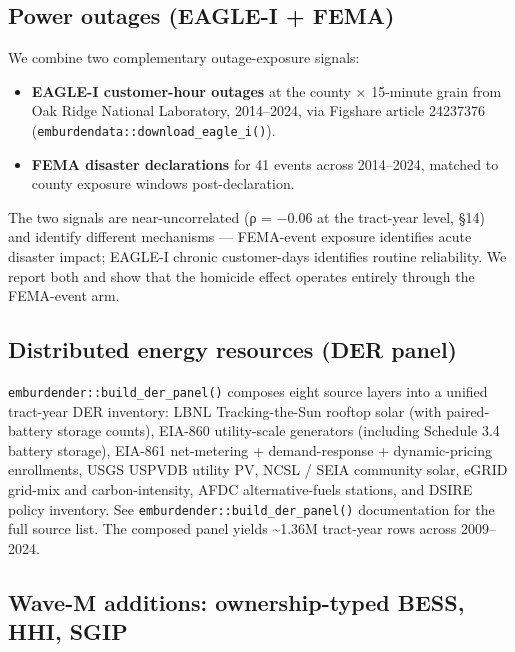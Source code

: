 \documentclass[
]{article}
\providecommand{\tightlist}{%
  \setlength{\itemsep}{0pt}\setlength{\parskip}{0pt}}
\begin{document}
\hypertarget{power-outages-eagle-i-fema}{%
\subsection{Power outages (EAGLE-I +
FEMA)}\label{power-outages-eagle-i-fema}}

We combine two complementary outage-exposure signals:

\begin{itemize}
\tightlist
\item
  \textbf{EAGLE-I customer-hour outages} at the county × 15-minute grain
  from Oak Ridge National Laboratory, 2014--2024, via Figshare article
  24237376 (\texttt{emburdendata::download\_eagle\_i()}).
\item
  \textbf{FEMA disaster declarations} for 41 events across 2014--2024,
  matched to county exposure windows post-declaration.
\end{itemize}

The two signals are near-uncorrelated (ρ = −0.06 at the tract-year
level, §14) and identify different mechanisms --- FEMA-event exposure
identifies acute disaster impact; EAGLE-I chronic customer-days
identifies routine reliability. We report both and show that the
homicide effect operates entirely through the FEMA-event arm.

\hypertarget{distributed-energy-resources-der-panel}{%
\subsection{Distributed energy resources (DER
panel)}\label{distributed-energy-resources-der-panel}}

\texttt{emburdender::build\_der\_panel()} composes eight source layers
into a unified tract-year DER inventory: LBNL Tracking-the-Sun rooftop
solar (with paired-battery storage counts), EIA-860 utility-scale
generators (including Schedule 3.4 battery storage), EIA-861
net-metering + demand-response + dynamic-pricing enrollments, USGS
USPVDB utility PV, NCSL / SEIA community solar, eGRID grid-mix and
carbon-intensity, AFDC alternative-fuels stations, and DSIRE policy
inventory. See \texttt{emburdender::build\_der\_panel()} documentation
for the full source list. The composed panel yields \textasciitilde1.36M
tract-year rows across 2009--2024.

\hypertarget{wave-m-additions-ownership-typed-bess-hhi-sgip}{%
\subsection{Wave-M additions: ownership-typed BESS, HHI,
SGIP}\label{wave-m-additions-ownership-typed-bess-hhi-sgip}}
\end{document}
